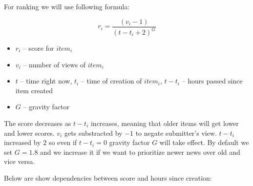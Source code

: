 \documentclass{article}
\begin{document}
For ranking we will use following formula:

\begin{equation}
    r_i = \frac{(v_i - 1)}{(t - t_i + 2)^G}
\end{equation}

\begin{itemize}
    \item $r_i$ -- score for $item_i$
    \item $v_i$ -- number of views of $item_i$
    \item $t$ -- time right now, $t_i$ -- time of creation of $item_i$, $t - t_i$ -- hours passed since item created
    \item $G$ -- gravity factor
\end{itemize}

The score decreases as $t - t_i$ increases, meaning that older items will get lower and lower scores. $v_i$ gets substracted by $-1$ to negate submitter's view. $t - t_i$ increased by $2$ so even if $t - t_i = 0$ gravity factor $G$ will take effect. By default we set $G=1.8$ and we increase it if we want to prioritize newer news over old and vice versa.


Below are show dependencies between score and hours since creation:
\end{document}
